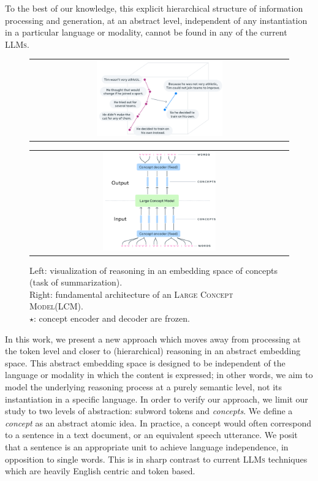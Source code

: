 \documentclass[twoside,11pt]{fairmeta}
\newcommand{\llms}{\textsc{LLMs}\xspace}
\newcommand{\lcm}{\textsc{LCM}\xspace}
\newcommand{\LCM}{\textsc{Large Concept Model}\xspace}
\begin{document}
To the best of our knowledge, this explicit hierarchical structure of information processing and generation, at an abstract level, independent of any instantiation in a particular language or modality, cannot be found in any of the current \llms.
\begin{figure}
     \begin{tabular}[c]{c}
         \includegraphics[width=0.5\textwidth]{figures/fig-intro-space-comms.pdf}
     \end{tabular}
     \hfill
     \begin{tabular}[c]{c}
         \includegraphics[width=0.45\textwidth]{figures/fig-intro-lcm-comms.pdf}
     \end{tabular}
    \caption{Left: visualization of reasoning in an embedding space of concepts (task of summarization). \\ Right: fundamental architecture of an \LCM (\lcm).\\$\star$: concept encoder and decoder are frozen.}
    \label{fig:intro:idea}
\end{figure}
In this work, we present a new approach which moves away from processing at the token level and closer to (hierarchical) reasoning in an abstract embedding space. This abstract embedding space is designed to be independent of the language or modality in which the content is expressed; in other words, we aim to model the underlying reasoning process at a purely semantic level, not its instantiation in a specific language. 
In order to verify our approach, we limit our study to two levels of abstraction: subword tokens and \textit{concepts}. We define a \textit{concept} as an abstract atomic idea.
In practice, a concept would often correspond to a sentence in a text document, or an equivalent speech utterance. We posit that a sentence is an appropriate unit to achieve language independence, in opposition to single words.
This is in sharp contrast to current \llms techniques which are heavily English centric and token based.
\end{document}
